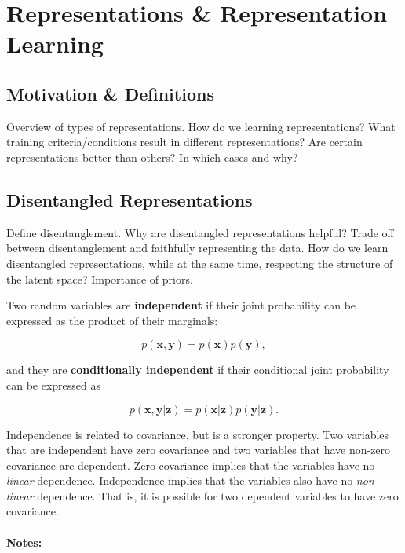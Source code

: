 \chapter{Representations \& Representation Learning}

\section{Motivation \& Definitions}

Overview of types of representations. How do we learning representations? What training criteria/conditions result in different representations? Are certain representations better than others? In which cases and why?



\section{Disentangled Representations}

Define disentanglement. Why are disentangled representations helpful? Trade off between disentanglement and faithfully representing the data. How do we learn disentangled representations, while at the same time, respecting the structure of the latent space? Importance of priors.

Two random variables are \textbf{independent} if their joint probability can be expressed as the product of their marginals:

\begin{equation}
	p(\mathbf{x}, \mathbf{y}) = p(\mathbf{x}) p(\mathbf{y}),
\end{equation}

\noindent and they are \textbf{conditionally independent} if their conditional joint probability can be expressed as

\begin{equation}
	p(\mathbf{x}, \mathbf{y} | \mathbf{z}) = p(\mathbf{x} | \mathbf{z}) p(\mathbf{y} | \mathbf{z}).
\end{equation}

Independence is related to covariance, but is a stronger property. Two variables that are independent have zero covariance and two variables that have non-zero covariance are dependent. Zero covariance implies that the variables have no \textit{linear} dependence. Independence implies that the variables also have no \textit{non-linear} dependence. That is, it is possible for two dependent variables to have zero covariance. 
\\
\\
\noindent \textbf{Notes:}

